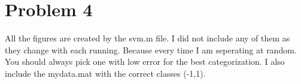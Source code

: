\section{Problem 4}
All the figures are created by the svm.m file.
I did not include any of them as they change with each running.
Because every time I am seperating at random.
You should always pick one with low error for the best categorization.
I also include the mydata.mat with the correct classes (-1,1).

